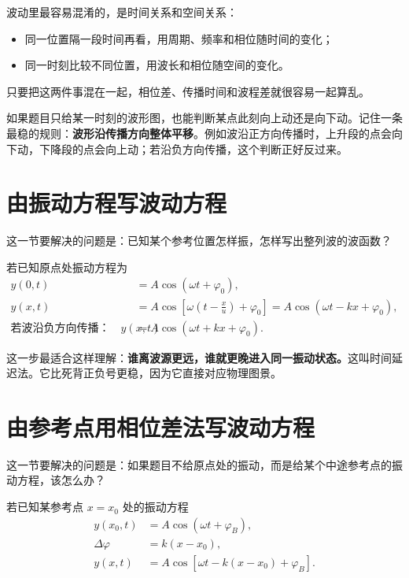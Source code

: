 \documentclass[lang=cn,11pt]{elegantbook}
\begin{document}
\begin{note}
波动里最容易混淆的，是时间关系和空间关系：
\begin{itemize}
  \item 同一位置隔一段时间再看，用周期、频率和相位随时间的变化；
  \item 同一时刻比较不同位置，用波长和相位随空间的变化。
\end{itemize}
只要把这两件事混在一起，相位差、传播时间和波程差就很容易一起算乱。
\end{note}

\begin{remark}
如果题目只给某一时刻的波形图，也能判断某点此刻向上动还是向下动。记住一条最稳的规则：\textbf{波形沿传播方向整体平移}。例如波沿正方向传播时，上升段的点会向下动，下降段的点会向上动；若沿负方向传播，这个判断正好反过来。
\end{remark}

\section{由振动方程写波动方程}

这一节要解决的问题是：已知某个参考位置怎样振，怎样写出整列波的波函数？

若已知原点处振动方程为
\[
\begin{aligned}
y(0,t)&=A\cos(\omega t+\varphi_0),\\
y(x,t)&=A\cos\left[\omega\left(t-\frac{x}{u}\right)+\varphi_0\right]
=A\cos(\omega t-kx+\varphi_0),\\
\text{若波沿负方向传播：}\quad
y(x,t)&=A\cos(\omega t+kx+\varphi_0).
\end{aligned}
\]

\begin{remark}
这一步最适合这样理解：\textbf{谁离波源更远，谁就更晚进入同一振动状态。}这叫时间延迟法。它比死背正负号更稳，因为它直接对应物理图景。
\end{remark}

\section{由参考点用相位差法写波动方程}

这一节要解决的问题是：如果题目不给原点处的振动，而是给某个中途参考点的振动方程，该怎么办？

若已知某参考点 \(x=x_0\) 处的振动方程
\[
\begin{aligned}
y(x_0,t)&=A\cos(\omega t+\varphi_B),\\
\Delta\varphi&=k(x-x_0),\\
y(x,t)&=A\cos\left[\omega t-k(x-x_0)+\varphi_B\right].
\end{aligned}
\]
\end{document}
